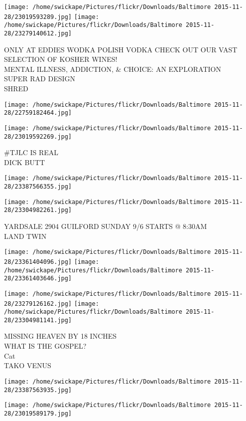 \documentclass[10pt,letterpaper]{article}
\begin{document}
\texttt{[image: /home/swickape/Pictures/flickr/Downloads/Baltimore 2015-11-28/23019593289.jpg]}
\texttt{[image: /home/swickape/Pictures/flickr/Downloads/Baltimore 2015-11-28/23279140612.jpg]}

ONLY AT EDDIES WODKA POLISH VODKA CHECK OUT OUR VAST SELECTION OF KOSHER WINES!\\
MENTAL ILLNESS, ADDICTION, \& CHOICE: AN EXPLORATION\\
SUPER RAD DESIGN\\
SHRED
\pagebreak

\texttt{[image: /home/swickape/Pictures/flickr/Downloads/Baltimore 2015-11-28/22759182464.jpg]}

\vspace{0.25in}
\texttt{[image: /home/swickape/Pictures/flickr/Downloads/Baltimore 2015-11-28/23019592269.jpg]}

\#TJLC IS REAL\\
DICK BUTT
\pagebreak

\texttt{[image: /home/swickape/Pictures/flickr/Downloads/Baltimore 2015-11-28/23387566355.jpg]}

\vspace{0.25in}
\texttt{[image: /home/swickape/Pictures/flickr/Downloads/Baltimore 2015-11-28/23304982261.jpg]}

YARDSALE 2904 GUILFORD SUNDAY 9/6 STARTS @ 8:30AM\\
LAND TWIN
\pagebreak

\texttt{[image: /home/swickape/Pictures/flickr/Downloads/Baltimore 2015-11-28/23361404096.jpg]}
\texttt{[image: /home/swickape/Pictures/flickr/Downloads/Baltimore 2015-11-28/23361403646.jpg]}

\texttt{[image: /home/swickape/Pictures/flickr/Downloads/Baltimore 2015-11-28/23279126162.jpg]}
\texttt{[image: /home/swickape/Pictures/flickr/Downloads/Baltimore 2015-11-28/23304981141.jpg]}

MISSING HEAVEN BY 18 INCHES\\
WHAT IS THE GOSPEL?\\
Cat\\
TAKO VENUS
\pagebreak

\texttt{[image: /home/swickape/Pictures/flickr/Downloads/Baltimore 2015-11-28/23387563935.jpg]}

\vspace{0.25in}
\texttt{[image: /home/swickape/Pictures/flickr/Downloads/Baltimore 2015-11-28/23019589179.jpg]}
\end{document}

